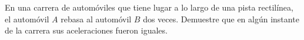 \item En una carrera de automóviles que tiene lugar a lo largo de una pista rectilínea, el automóvil $A$ rebasa al automóvil $B$ dos veces. Demuestre que en algún instante de la carrera sus aceleraciones fueron iguales.
